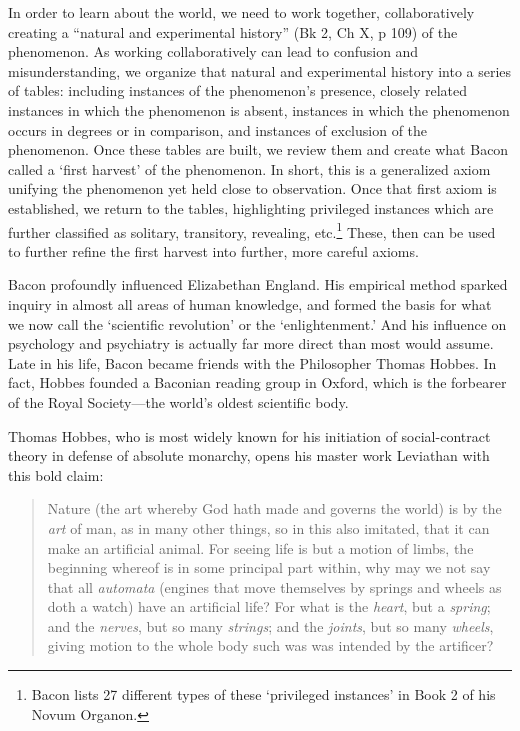 \begin{refsection}
In order to learn about the world, we need to work together, collaboratively creating a “natural and experimental history” (Bk 2, Ch X, p 109) of the phenomenon. As working collaboratively can lead to confusion and misunderstanding, we organize that natural and experimental history into a series of tables: including instances of the phenomenon's presence, closely related instances in which the phenomenon is absent, instances in which the phenomenon occurs in degrees or in comparison, and instances of exclusion of the phenomenon. Once these tables are built, we review them and create what Bacon called a `first harvest' of the phenomenon. In short, this is a generalized axiom unifying the phenomenon yet held close to observation. Once that first axiom is established, we return to the tables, highlighting privileged instances which are further classified as solitary, transitory, revealing, etc.\footnote{Bacon lists 27 different types of these `privileged instances' in Book 2 of his Novum Organon.} These, then can be used to further refine the first harvest into further, more careful axioms.

Bacon profoundly influenced Elizabethan England. His empirical method sparked inquiry in almost all areas of human knowledge, and formed the basis for what we now call the `scientific revolution' or the `enlightenment.' And his influence on psychology and psychiatry is actually far more direct than most would assume. Late in his life, Bacon became friends with the Philosopher Thomas Hobbes. In fact, Hobbes founded a Baconian reading group in Oxford, which is the forbearer of the Royal Society—the world's oldest scientific body.

Thomas Hobbes, who is most widely known for his initiation of social-contract theory in defense of absolute monarchy, opens his master work Leviathan with this bold claim:

\begin{quote}

Nature (the art whereby God hath made and governs the world) is by the \emph{art} of man, as in many other things, so in this also imitated, that it can make an artificial animal. For seeing life is but a motion of limbs, the beginning whereof is in some principal part within, why may we not say that all \emph{automata} (engines that move themselves by springs and wheels as doth a watch) have an artificial life? For what is the \emph{heart}, but a \emph{spring}; and the \emph{nerves}, but so many \emph{strings}; and the \emph{joints}, but so many \emph{wheels}, giving motion to the whole body such was was intended by the artificer? ~\citep[Ch 1, \S 1]{Hobbes:1651wh}
\end{quote}


\end{refsection}
